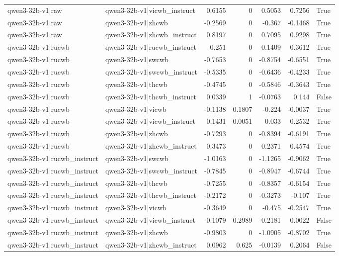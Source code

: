 \begin{table}
\begin{tabular}{l l r r r r l}
qwen3-32b-v1|raw & qwen3-32b-v1|vicwb_instruct & 0.6155 & 0 & 0.5053 & 0.7256 & True \\
qwen3-32b-v1|raw & qwen3-32b-v1|zhcwb & -0.2569 & 0 & -0.367 & -0.1468 & True \\
qwen3-32b-v1|raw & qwen3-32b-v1|zhcwb_instruct & 0.8197 & 0 & 0.7095 & 0.9298 & True \\
qwen3-32b-v1|rucwb & qwen3-32b-v1|rucwb_instruct & 0.251 & 0 & 0.1409 & 0.3612 & True \\
qwen3-32b-v1|rucwb & qwen3-32b-v1|swcwb & -0.7653 & 0 & -0.8754 & -0.6551 & True \\
qwen3-32b-v1|rucwb & qwen3-32b-v1|swcwb_instruct & -0.5335 & 0 & -0.6436 & -0.4233 & True \\
qwen3-32b-v1|rucwb & qwen3-32b-v1|thcwb & -0.4745 & 0 & -0.5846 & -0.3643 & True \\
qwen3-32b-v1|rucwb & qwen3-32b-v1|thcwb_instruct & 0.0339 & 1 & -0.0763 & 0.144 & False \\
qwen3-32b-v1|rucwb & qwen3-32b-v1|vicwb & -0.1138 & 0.1807 & -0.224 & -0.0037 & True \\
qwen3-32b-v1|rucwb & qwen3-32b-v1|vicwb_instruct & 0.1431 & 0.0051 & 0.033 & 0.2532 & True \\
qwen3-32b-v1|rucwb & qwen3-32b-v1|zhcwb & -0.7293 & 0 & -0.8394 & -0.6191 & True \\
qwen3-32b-v1|rucwb & qwen3-32b-v1|zhcwb_instruct & 0.3473 & 0 & 0.2371 & 0.4574 & True \\
qwen3-32b-v1|rucwb_instruct & qwen3-32b-v1|swcwb & -1.0163 & 0 & -1.1265 & -0.9062 & True \\
qwen3-32b-v1|rucwb_instruct & qwen3-32b-v1|swcwb_instruct & -0.7845 & 0 & -0.8947 & -0.6744 & True \\
qwen3-32b-v1|rucwb_instruct & qwen3-32b-v1|thcwb & -0.7255 & 0 & -0.8357 & -0.6154 & True \\
qwen3-32b-v1|rucwb_instruct & qwen3-32b-v1|thcwb_instruct & -0.2172 & 0 & -0.3273 & -0.107 & True \\
qwen3-32b-v1|rucwb_instruct & qwen3-32b-v1|vicwb & -0.3649 & 0 & -0.475 & -0.2547 & True \\
qwen3-32b-v1|rucwb_instruct & qwen3-32b-v1|vicwb_instruct & -0.1079 & 0.2989 & -0.2181 & 0.0022 & False \\
qwen3-32b-v1|rucwb_instruct & qwen3-32b-v1|zhcwb & -0.9803 & 0 & -1.0905 & -0.8702 & True \\
qwen3-32b-v1|rucwb_instruct & qwen3-32b-v1|zhcwb_instruct & 0.0962 & 0.625 & -0.0139 & 0.2064 & False \\

\end{tabular}
\end{table}
